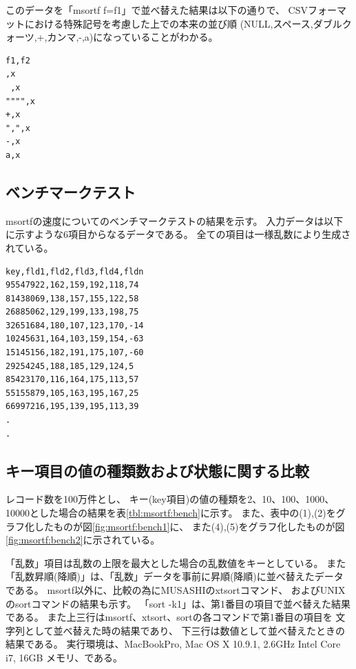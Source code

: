 このデータを「msortf f=f1」で並べ替えた結果は以下の通りで、
CSVフォーマットにおける特殊記号を考慮した上での本来の並び順
(NULL,スペース,ダブルクォーツ,+,カンマ,-,a)になっていることがわかる。\\

\begin{Verbatim}[baselinestretch=0.7,frame=single,fontsize=\small]
f1,f2
,x
 ,x
"""",x
+,x
",",x
-,x
a,x
\end{Verbatim}

\subsection*{ベンチマークテスト}
msortfの速度についてのベンチマークテストの結果を示す。
入力データは以下に示すような6項目からなるデータである。
全ての項目は一様乱数により生成されている。\\

\begin{Verbatim}[baselinestretch=0.7,frame=single,fontsize=\small]
key,fld1,fld2,fld3,fld4,fldn
95547922,162,159,192,118,74
81438069,138,157,155,122,58
26885062,129,199,133,198,75
32651684,180,107,123,170,-14
10245631,164,103,159,154,-63
15145156,182,191,175,107,-60
29254245,188,185,129,124,5
85423170,116,164,175,113,57
55155879,105,163,195,167,25
66997216,195,139,195,113,39
.
.
\end{Verbatim}

\subsection*{キー項目の値の種類数および状態に関する比較}
レコード数を100万件とし、
キー(key項目)の値の種類を2、10、100、1000、10000とした場合の結果を表\ref{tbl:msortf:bench}に示す。
また、表中の(1),(2)をグラフ化したものが図\ref{fig:msortf:bench1}に、
また(4),(5)をグラフ化したものが図\ref{fig:msortf:bench2}に示されている。

「乱数」項目は乱数の上限を最大とした場合の乱数値をキーとしている。
また「乱数昇順(降順)」は、「乱数」データを事前に昇順(降順)に並べ替えたデータである。
msortf以外に、比較の為にMUSASHIのxtsortコマンド、
およびUNIXのsortコマンドの結果も示す。
「sort -k1」は、第1番目の項目で並べ替えた結果である。
また上三行はmsortf、xtsort、sortの各コマンドで第1番目の項目を
文字列として並べ替えた時の結果であり、
下三行は数値として並べ替えたときの結果である。
実行環境は、MacBookPro, Mac OS X 10.9.1, 2.6GHz Intel Core i7, 16GB メモリ、である。



